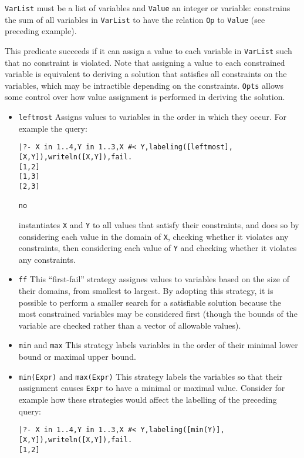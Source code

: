 \begin{description}
%
{\tt VarList} must be a list of variables and {\tt Value} an integer
or variable: constrains the sum of all variables in {\tt VarList} to
have the relation {\tt Op} to {\tt Value} (see preceding example).

%
This predicate succeeds if it can assign a value to each variable in
{\tt VarList} such that no constraint is violated.  Note that
assigning a value to each constrained variable is equivalent to
deriving a solution that satisfies all constraints on the variables,
which may be intractible depending on the constraints.  {\tt Opts}
allows some control over how value assignment is performed in deriving the solution.
%
\begin{itemize}
\item {\tt leftmost} Assigns values to variables in the order in which
  they occur.  For example the query:
%
{\small
\begin{verbatim}
|?- X in 1..4,Y in 1..3,X #< Y,labeling([leftmost],[X,Y]),writeln([X,Y]),fail.
[1,2]
[1,3]
[2,3]

no
\end{verbatim}
}
%
instantiates {\tt X} and {\tt Y} to all values that satisfy their
constraints, and does so by considering each value in the domain of
{\tt X}, checking whether it violates any constraints, then
considering each value of {\tt Y} and checking whether it violates any
constraints.
%
\item {\tt ff} This ``first-fail'' strategy assignes values to
  variables based on the size of their domains, from smallest to
  largest.  By adopting this strategy, it is possible to perform a
  smaller search for a satisfiable solution because the most
  constrained variables may be considered first (though the bounds of
  the variable are checked rather than a vector of allowable values).  
%
\item {\tt min} and {\tt max} This strategy labels variables in the
  order of their minimal lower bound or maximal upper bound.
%
\item {\tt min(Expr)} and {\tt max(Expr)} This strategy labels the
  variables so that their assignment causes {\tt Expr} to have a
  minimal or maximal value.  Consider for example how these strategies
  would affect the labelling of the preceding query:
{\small
\begin{verbatim}
|?- X in 1..4,Y in 1..3,X #< Y,labeling([min(Y)],[X,Y]),writeln([X,Y]),fail.
[1,2]


\end{verbatim}}
\end{itemize}
\end{description}
